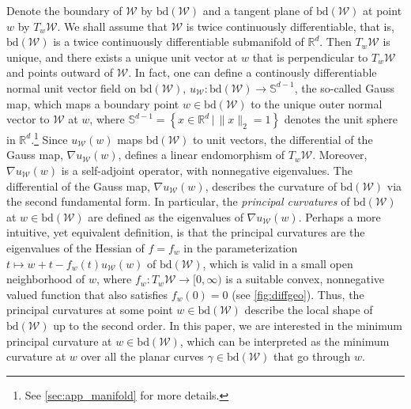 \documentclass[english]{article}
\newcommand{\todoa}[2][]{\todo[color=Purple!20,size=\tiny,#1]{A: #2}}
\newcommand{\cW}{\mathcal{W}}
\newcommand{\R}{\mathbb{R}}
\newcommand{\bS}{\mathbb{S}}
\newcommand{\set}[2]{\left\{#1 \,\vert\, #2 \right\}}
\newcommand{\bd}{\mathrm{bd}}
\begin{document}
Denote the boundary of $\cW$ by $\bd(\cW)$ and a tangent plane of $\bd(\cW)$ at point $w$ by $T_w\cW$.
We shall assume that $\cW$ is twice continuously differentiable, that is, $\bd(\cW)$ is a twice continuously differentiable submanifold of $\R^d$. Then $T_w\cW$ is unique,
and there exists a unique unit vector at $w$ that is perpendicular to $T_w\cW$ and points outward of $\cW$.
In fact, one can define a continously differentiable normal unit vector field on $\bd(\cW)$, $u_{\cW}: \bd(\cW) \to \bS^{d-1}$, the so-called Gauss map, which maps a boundary point $w\in \bd(\cW)$ to the unique outer normal vector to $\cW$ at $w$, where
$\bS^{d-1}=\set{x\in\R^d}{\|x\|_2=1}$ denotes the unit sphere in $\R^d$.\footnote{See \cref{sec:app_manifold} for more details.}
Since $u_{\cW}(w)$ maps $\bd(\cW)$ to unit vectors, the differential of the Gauss map, $\nabla u_{\cW}(w)$, defines a linear endomorphism of $T_w\cW$. Moreover, $\nabla u_{\cW}(w)$ is a self-adjoint operator, with nonnegative eigenvalues.
The differential of the Gauss map, $\nabla u_{\cW}(w)$, describes the curvature of $\bd(\cW)$ via the second fundamental form. In particular, the \emph{principal curvatures} of $\bd(\cW)$ at $w\in\bd(\cW)$ are defined as the eigenvalues of $\nabla u_{\cW}(w)$.   
Perhaps a more intuitive, yet equivalent definition, is that the principal curvatures are the eigenvalues
of the Hessian of $f=f_w$ in the parameterization $t\mapsto w+t-f_w(t) u_{\cW}(w)$ of $\bd(\cW)$,
which is valid in a small open neighborhood of $w$, where $f_w: T_w \cW \to [0,\infty)$ is
a suitable convex, nonnegative valued function that also satisfies $f_w(0)= 0$ (see \cref{fig:diffgeo}\todoa{Move the two figures further}).
Thus, the principal curvatures at some point $w\in \bd(\cW)$ describe the local shape of $\bd(\cW)$ 
up to the second order. 
In this paper, we are interested in the minimum principal curvature at $w\in\bd(\cW)$, which can be interpreted as the minimum curvature at $w$ over all the planar curves $\gamma \in \bd(\cW)$ that go through $w$. 
\end{document}
